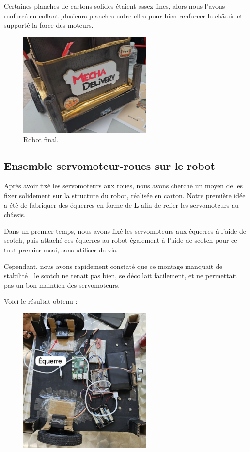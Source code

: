 \documentclass[a4paper,12pt]{report}  %
\begin{document}
Certaines planches de cartons solides étaient assez fines, alors nous l’avons renforcé en collant plusieurs planches entre elles pour bien renforcer le châssis et supporté la force des moteurs.

\begin{figure}[H]
	\centering
	\includegraphics[width=0.6\textwidth]{./attachments/robot_final_1.png}
	\caption{Robot final.}
\end{figure}


\subsection{Ensemble servomoteur-roues sur le robot}
Après avoir fixé les servomoteurs aux roues, nous avons cherché un moyen de les fixer solidement sur la structure du robot, réalisée en carton. Notre première idée a été de fabriquer des équerres en forme de \textbf{L} afin de relier les servomoteurs au châssis.

Dans un premier temps, nous avons fixé les servomoteurs aux équerres à l’aide de scotch, puis attaché ces équerres au robot également à l’aide de scotch pour ce tout premier essai, sans utiliser de vis.

Cependant, nous avons rapidement constaté que ce montage manquait de stabilité : le scotch ne tenait pas bien, se décollait facilement, et ne permettait pas un bon maintien des servomoteurs.

Voici le résultat obtenu :
\begin{figure}[H]
	\centering
	\includegraphics[width=0.6\textwidth]{./attachments/servomoteur-roues.png}
	\caption{}
\end{figure}
\end{document}
